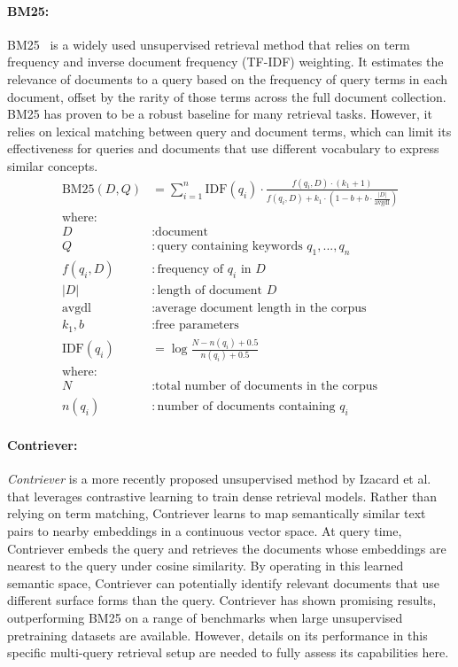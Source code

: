 \paragraph{BM25:}
BM25~\cite{bm25} is a widely used unsupervised retrieval method that relies on term frequency and inverse document frequency (TF-IDF) weighting.
It estimates the relevance of documents to a query based on the frequency of query terms in each document, offset by the rarity of those terms across the full document collection.
BM25 has proven to be a robust baseline for many retrieval tasks.
However, it relies on lexical matching between query and document terms, which can limit its effectiveness for queries and documents that use different vocabulary to express similar concepts.
\begin{align*}
    \text{BM25}(D,Q) &= \sum_{i=1}^n \text{IDF}(q_i) \cdot \frac{f(q_i, D) \cdot (k_1 + 1)}{f(q_i, D) + k_1 \cdot (1 - b + b \cdot \frac{|D|}{\text{avgdl}})} \\[2ex]
    \text{where:} \\
    D &: \text{document} \\
    Q &: \text{query containing keywords } q_1, ..., q_n \\
    f(q_i, D) &: \text{frequency of } q_i \text{ in } D \\
    |D| &: \text{length of document } D \\
    \text{avgdl} &: \text{average document length in the corpus} \\
    k_1, b &: \text{free parameters} \\[2ex]
    \text{IDF}(q_i) &= \log \frac{N - n(q_i) + 0.5}{n(q_i) + 0.5} \\[2ex]
    \text{where:} \\
    N &: \text{total number of documents in the corpus} \\
    n(q_i) &: \text{number of documents containing } q_i
\end{align*}

\paragraph{Contriever:}
\textit{Contriever} is a more recently proposed unsupervised method by Izacard et al.\cite{izacard2022unsuperviseddenseinformationretrieval} that leverages contrastive learning to train dense retrieval models.
Rather than relying on term matching, Contriever learns to map semantically similar text pairs to nearby embeddings in a continuous vector space.
At query time, Contriever embeds the query and retrieves the documents whose embeddings are nearest to the query under cosine similarity.
By operating in this learned semantic space, Contriever can potentially identify relevant documents that use different surface forms than the query.
Contriever has shown promising results, outperforming BM25 on a range of benchmarks when large unsupervised pretraining datasets are available.
However, details on its performance in this specific multi-query retrieval setup are needed to fully assess its capabilities here.

